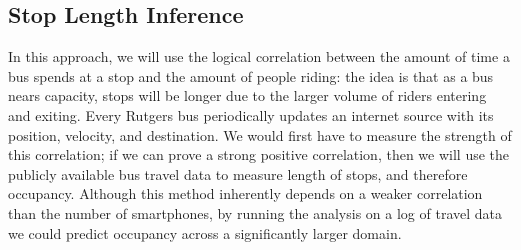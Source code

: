 \documentclass[letterpaper,english]{scrreprt}
\begin{document}
\subsection*{Stop Length Inference}

In this approach, we will use the logical correlation between the amount of time a bus spends at a stop and the amount of people riding: the idea is that as a bus nears capacity, stops will be longer due to the larger volume of riders entering and exiting.
Every Rutgers bus periodically updates an internet source with its position, velocity, and destination.
We would first have to measure the strength of this correlation; if we can prove a strong positive correlation, then we will use the publicly available bus travel data to measure length of stops, and therefore occupancy.
Although this method inherently depends on a weaker correlation than the number of smartphones, by running the analysis on a log of travel data we could predict occupancy across a significantly larger domain.
\end{document}
